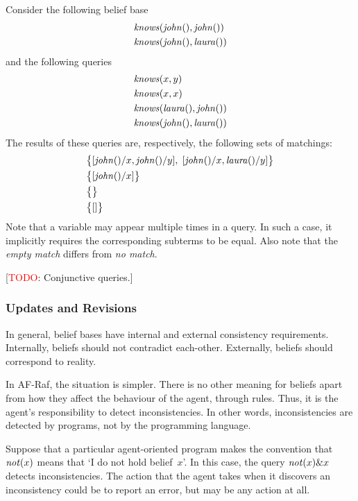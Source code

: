 \documentclass[a4paper,12pt,oneside,fleqn]{book} %
\newcommand{\todo}[1]{[\textcolor{red}{TODO}: #1]}
\begin{document}
\begin{example} Consider the following belief base \begin{align} &{\it
knows}({\it john}(), {\it john}()) \\ &{\it knows}({\it john}(), {\it
laura}()) \end{align} and the following queries \begin{align} &{\it
knows}(x, y) \\ &{\it knows}(x, x) \\ &{\it knows}({\it laura}(), {\it
john}()) \\ &{\it knows}({\it john}(), {\it laura}()) \end{align} The
results of these queries are, respectively, the following sets of
matchings: \begin{align} &\bigl\{ [{\it john}()/x, {\it john}()/y],\; [{\it
john}()/x,{\it laura}()/y] \bigr\} \\ &\bigl\{ [{\it john}()/x] \bigr\} \\
&\bigl\{\bigr\} \\ &\bigl\{[]\bigr\} \end{align} Note that a variable may
appear multiple times in a query.  In such a case, it implicitly requires
the corresponding subterms to be equal.  Also note that the \emph{empty
match} differs from \emph{no match}.
\end{example}

\todo{Conjunctive queries.}

\subsubsection{Updates and Revisions}

In general, belief bases have internal and external consistency
requirements.  Internally, beliefs should not contradict each-other.
Externally, beliefs should correspond to reality.

In AF-Raf, the situation is simpler.  There is no other meaning for beliefs
apart from how they affect the behaviour of the agent, through rules.
Thus, it is the agent's responsibility to detect inconsistencies.  In other
words, inconsistencies are detected by programs, not by the programming
language.

\begin{example} Suppose that a particular agent-oriented program makes the
convention that ${\it not}(x)$ means that `I do not hold belief~$x$'.  In
this case, the query ${\it not}(x)\&x$ detects inconsistencies.  The action
that the agent takes when it discovers an inconsistency could be to report
an error, but may be any action at all.  \end{example}
\end{document}
